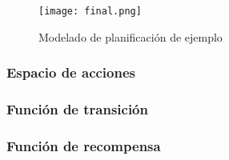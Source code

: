 \begin{figure}[ht]
    \centering
    \texttt{[image: final.png]}
    \caption{Modelado de planificación de ejemplo}
    \label{fig:final-solution}
\end{figure}


\subsubsection{Espacio de acciones}

\subsubsection{Función de transición}

\subsubsection{Función de recompensa}

\pagebreak

